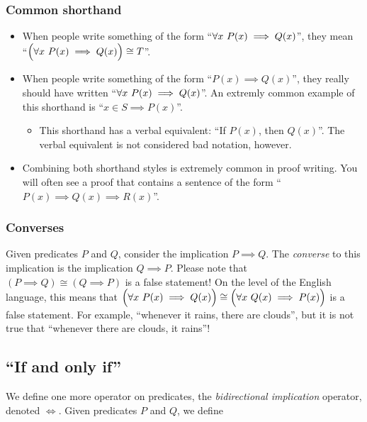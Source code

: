 \subsubsection{Common shorthand}

\begin{itemize}
    \item When people write something of the form ``$\forall x \text{ } P(x) \implies Q(x)$'', they mean \\ ``$\Big(\forall x \text{ } P(x) \implies Q(x)\Big) \cong T$''. 
    \item When people write something of the form ``$P(x) \implies Q(x)$'', they really should have written ``$\forall x \text{ } P(x) \implies Q(x)$''. An extremly common example of this shorthand is ``$x \in S \implies P(x)$''.
    \begin{itemize}
        \item This shorthand has a verbal equivalent: ``If $P(x)$, then $Q(x)$''. The verbal equivalent is not considered bad notation, however.
    \end{itemize}
    \item Combining both shorthand styles is extremely common in proof writing. You will often see a proof that contains a sentence of the form ``$P(x) \implies Q(x) \implies R(x)$''.
\end{itemize}

\subsubsection{Converses}

Given predicates $P$ and $Q$, consider the implication $P \implies Q$. The \textit{converse} to this implication is the implication $Q \implies P$. Please note that $(P \implies Q) \cong (Q \implies P)$ is a false statement! On the level of the English language, this means that $\Big( \forall x \text{ } P(x) \implies Q(x) \Big) \cong \Big( \forall x \text{ } Q(x) \implies P(x) \Big)$ is a false statement. For example, ``whenever it rains, there are clouds'', but it is not true that ``whenever there are clouds, it rains''!

\subsection*{``If and only if''}

We define one more operator on predicates, the \textit{bidirectional implication} operator, denoted $\iff$. Given predicates $P$ and $Q$, we define

